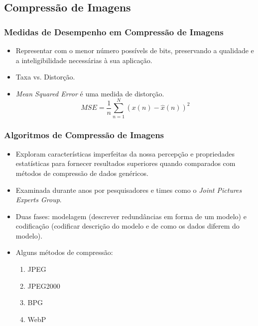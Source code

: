\documentclass{beamer}
\begin{document}
\subsection{Compressão de Imagens}
\begin{frame}
\frametitle{Medidas de Desempenho em Compressão de Imagens}
\begin{itemize}
    \item Representar com o menor número possívels de bits, preservando a qualidade e a inteligibilidade necessárias à sua aplicação.
    \item Taxa vs. Distorção.
    \item \textit{Mean Squared Error} é uma medida de distorção.
    \begin{equation} MSE = \dfrac{1}{n}\sum_{n=1}^{N}{(x(n) - \hat{x}(n))}^2 \end{equation}
\end{itemize}
\end{frame}
\begin{frame}
\frametitle{Algoritmos de Compressão de Imagens}
\begin{itemize}
    \item Exploram características imperfeitas da nossa percepção e propriedades estatísticas para fornecer resultados superiores quando comparados com métodos de compressão de dados genéricos.
    \item Examinada durante anos por pesquisadores e times como o \textit{Joint Pictures Experts Group}.
    \item Duas fases: modelagem (descrever redundâncias em forma de um modelo) e codificação (codificar descrição do modelo e de como os dados diferem do modelo).
    \item Alguns métodos de compressão:
    \begin{enumerate}
    \item JPEG~\cite{jpeg}
    \item JPEG2000~\cite{jpeg2000}
    \item BPG~\cite{bpg}
    \item WebP~\cite{webp}
    \end{enumerate}
\end{itemize}
\end{frame}
\end{document}

